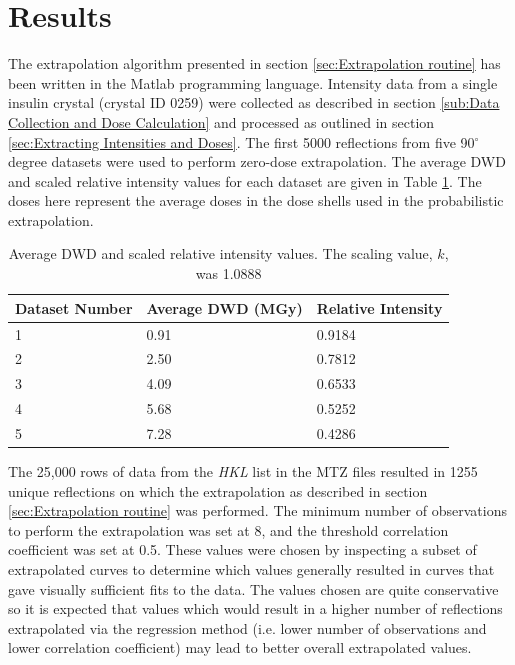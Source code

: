 \section{Results}
\label{sec:Results - Zero-dose extrapolation}
The extrapolation algorithm presented in section \ref{sec:Extrapolation routine} has been written in the Matlab programming language.
Intensity data from a single insulin crystal (crystal ID 0259) were collected as described in section \ref{sub:Data Collection and Dose Calculation} and processed as outlined in section \ref{sec:Extracting Intensities and Doses}.
The first 5000 reflections from five 90$^{\circ}$ degree datasets were used to perform zero-dose extrapolation.
The average DWD and scaled relative intensity values for each dataset are given in Table \ref{tab:Average DWD and Relative Intensity}.
The doses here represent the average doses in the dose shells used in the probabilistic extrapolation.
\begin{table}[ht!]
	\caption{Average DWD and scaled relative intensity values. The scaling value, $k$, was 1.0888}
	\centering
	\begin{tabular}{p{3.2cm} | p{3.75cm} | p{3.3cm}}
		Dataset Number    & Average DWD (MGy)     & Relative Intensity \\
		\hline
		1                 & 0.91                  & 0.9184 \\
		2                 & 2.50                  & 0.7812 \\
		3                 & 4.09                  & 0.6533 \\
        4                 & 5.68                  & 0.5252 \\
        5                 & 7.28                  & 0.4286 \\
	\end{tabular}
	\label{tab:Average DWD and Relative Intensity}
\end{table}
The 25,000 rows of data from the \textit{HKL} list in the MTZ files resulted in 1255 unique reflections on which the extrapolation as described in section \ref{sec:Extrapolation routine} was performed.
The minimum number of observations to perform the extrapolation was set at 8, and the threshold correlation coefficient was set at 0.5.
These values were chosen by inspecting a subset of extrapolated curves to determine which values generally resulted in curves that gave visually sufficient fits to the data.
The values chosen are quite conservative so it is expected that values which would result in a higher number of reflections extrapolated via the regression method (i.e. lower number of observations and lower correlation coefficient) may lead to better overall extrapolated values.
